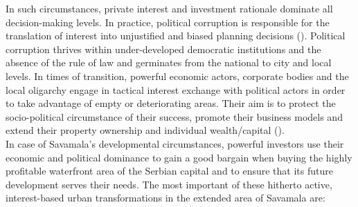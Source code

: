 \documentclass[11pt]{report}
\begin{document}
In such circumstances, private interest and investment rationale dominate all decision-making levels. In practice, political corruption is responsible for the translation of interest into unjustified and biased planning decisions 
(\href{Nedovic}{\citealt{nedovic-budic_adjustment_2001}}).
Political corruption thrives within under-developed democratic institutions and the absence of the rule of law and germinates from the national to city and local levels. In times of transition, powerful economic actors, corporate bodies and the local oligarchy engage in tactical interest exchange with political actors in order to take advantage of empty or deteriorating areas. Their aim is to protect the socio-political circumstance of their success, promote their business models and extend their property ownership and individual wealth/capital (\href{Lazarevic}{\citealt{bajec_rational_2009}}).
\\

In case of Savamala’s developmental circumstances, powerful investors use their economic and political dominance to gain a good bargain when buying the highly profitable waterfront area of the Serbian capital and to ensure that its future development serves their needs. The most important of these hitherto active, interest-based urban transformations in the extended area of Savamala are:
\end{document}
